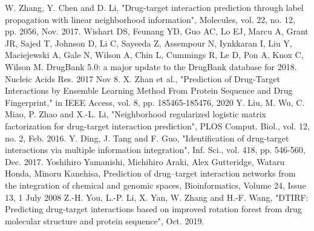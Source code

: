 \documentclass[conference]{IEEEtran}
\begin{document}
\begin{thebibliography}{00}
W. Zhang, Y. Chen and D. Li, "Drug-target interaction prediction through label propagation with linear neighborhood information", Molecules, vol. 22, no. 12, pp. 2056, Nov. 2017.
Wishart DS, Feunang YD, Guo AC, Lo EJ, Marcu A, Grant JR, Sajed T, Johnson D, Li C, Sayeeda Z, Assempour N, Iynkkaran I, Liu Y, Maciejewski A, Gale N, Wilson A, Chin L, Cummings R, Le D, Pon A, Knox C, Wilson M. DrugBank 5.0: a major update to the DrugBank database for 2018. Nucleic Acids Res. 2017 Nov 8.
 X. Zhan et al., "Prediction of Drug-Target Interactions by Ensemble Learning Method From Protein Sequence and Drug Fingerprint," in IEEE Access, vol. 8, pp. 185465-185476, 2020
Y. Liu, M. Wu, C. Miao, P. Zhao and X.-L. Li, "Neighborhood regularized logistic matrix factorization for drug-target interaction prediction", PLOS Comput. Biol., vol. 12, no. 2, Feb. 2016.
Y. Ding, J. Tang and F. Guo, "Identification of drug-target interactions via multiple information integration", Inf. Sci., vol. 418, pp. 546-560, Dec. 2017.
 Yoshihiro Yamanishi, Michihiro Araki, Alex Gutteridge, Wataru Honda, Minoru Kanehisa, Prediction of drug–target interaction networks from the integration of chemical and genomic spaces, Bioinformatics, Volume 24, Issue 13, 1 July 2008
 Z.-H. You, L.-P. Li, X. Yan, W. Zhang and H.-F. Wang, "DTIRF: Predicting drug-target interactions based on improved rotation forest from drug molecular structure and protein sequence", Oct. 2019.
\end{thebibliography}
\end{document}
